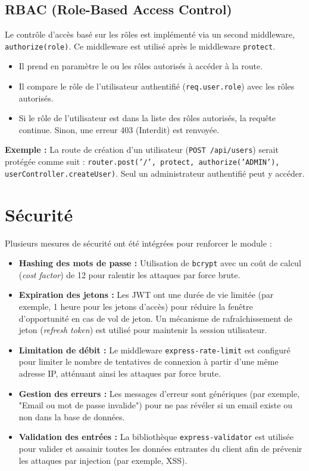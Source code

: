 \documentclass{report}
\begin{document}
\subsection{\color{SoftEspresso}RBAC (Role-Based Access Control)}
Le contrôle d'accès basé sur les rôles est implémenté via un second middleware, \texttt{authorize(role)}. Ce middleware est utilisé après le middleware \texttt{protect}.
\begin{itemize}
    \item Il prend en paramètre le ou les rôles autorisés à accéder à la route.
    \item Il compare le rôle de l'utilisateur authentifié (\texttt{req.user.role}) avec les rôles autorisés.
    \item Si le rôle de l'utilisateur est dans la liste des rôles autorisés, la requête continue. Sinon, une erreur 403 (Interdit) est renvoyée.
\end{itemize}
\textbf{\color{SoftEspresso}Exemple :} La route de création d'un utilisateur (\texttt{POST /api/users}) serait protégée comme suit : \texttt{router.post('/', protect, authorize('ADMIN'), userController.createUser)}. Seul un administrateur authentifié peut y accéder.

\section{\color{SoftEspresso}Sécurité}
Plusieurs mesures de sécurité ont été intégrées pour renforcer le module :
\begin{itemize}
    \item \textbf{\color{SoftEspresso}Hashing des mots de passe :} Utilisation de \texttt{bcrypt} avec un coût de calcul (\textit{cost factor}) de 12 pour ralentir les attaques par force brute.
    \item \textbf{\color{SoftEspresso}Expiration des jetons :} Les JWT ont une durée de vie limitée (par exemple, 1 heure pour les jetons d'accès) pour réduire la fenêtre d'opportunité en cas de vol de jeton. Un mécanisme de rafraîchissement de jeton (\textit{refresh token}) est utilisé pour maintenir la session utilisateur.
    \item \textbf{\color{SoftEspresso}Limitation de débit :} Le middleware \texttt{express-rate-limit} est configuré pour limiter le nombre de tentatives de connexion à partir d'une même adresse IP, atténuant ainsi les attaques par force brute.
    \item \textbf{\color{SoftEspresso}Gestion des erreurs :} Les messages d'erreur sont génériques (par exemple, "Email ou mot de passe invalide") pour ne pas révéler si un email existe ou non dans la base de données.
    \item \textbf{\color{SoftEspresso}Validation des entrées :} La bibliothèque \texttt{express-validator} est utilisée pour valider et assainir toutes les données entrantes du client afin de prévenir les attaques par injection (par exemple, XSS).
\end{itemize}
\end{document}
